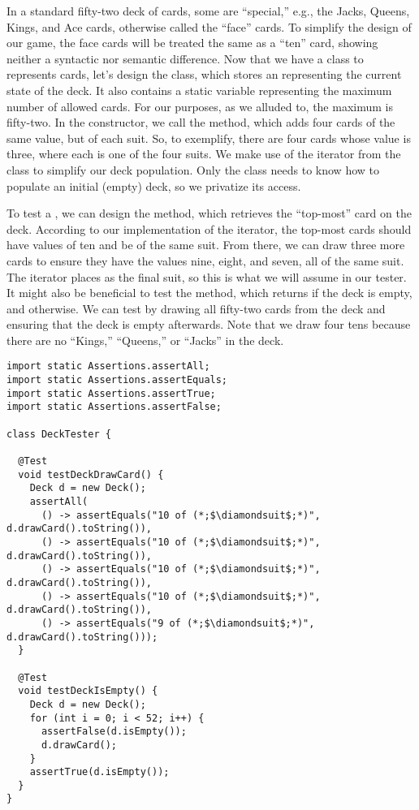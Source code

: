 In a standard fifty-two deck of cards, some are ``special,'' e.g., the Jacks, Queens, Kings, and Ace cards, otherwise called the ``face'' cards. 
To simplify the design of our game, the face cards will be treated the same as a ``ten'' card, showing neither a syntactic nor semantic difference. 
Now that we have a class to represents cards, let's design the  class, which stores an  representing the current state of the deck. 
It also contains a static variable representing the maximum number of allowed cards. 
For our purposes, as we alluded to, the maximum is fifty-two. 
In the  constructor, we call the  method, which adds four cards of the same value, but of each suit. 
So, to exemplify, there are four cards whose value is three, where each is one of the four suits. 
We make use of the iterator from the  class to simplify our deck population. 
Only the  class needs to know how to populate an initial (empty) deck, so we privatize its access.

To test a , we can design the  method, which retrieves the ``top-most'' card on the deck. 
According to our implementation of the iterator, the top-most cards should have values of ten and be of the same suit. 
From there, we can draw three more cards to ensure they have the values nine, eight, and seven, all of the same suit. 
The iterator places  as the final suit, so this is what we will assume in our tester. 
It might also be beneficial to test the  method, which returns  if the deck is empty, and  otherwise. 
We can test  by drawing all fifty-two cards from the deck and ensuring that the deck is empty afterwards. 
Note that we draw four tens because there are no ``Kings,'' ``Queens,'' or ``Jacks'' in the deck.

\begin{lstlisting}[language=MyJava]
import static Assertions.assertAll;
import static Assertions.assertEquals;
import static Assertions.assertTrue;
import static Assertions.assertFalse;

class DeckTester {

  @Test
  void testDeckDrawCard() {
    Deck d = new Deck();
    assertAll(
      () -> assertEquals("10 of (*;$\diamondsuit$;*)", d.drawCard().toString()),
      () -> assertEquals("10 of (*;$\diamondsuit$;*)", d.drawCard().toString()),
      () -> assertEquals("10 of (*;$\diamondsuit$;*)", d.drawCard().toString()),
      () -> assertEquals("10 of (*;$\diamondsuit$;*)", d.drawCard().toString()),
      () -> assertEquals("9 of (*;$\diamondsuit$;*)", d.drawCard().toString()));
  }

  @Test
  void testDeckIsEmpty() {
    Deck d = new Deck();
    for (int i = 0; i < 52; i++) {
      assertFalse(d.isEmpty());
      d.drawCard();
    }
    assertTrue(d.isEmpty());
  }
}
\end{lstlisting}

